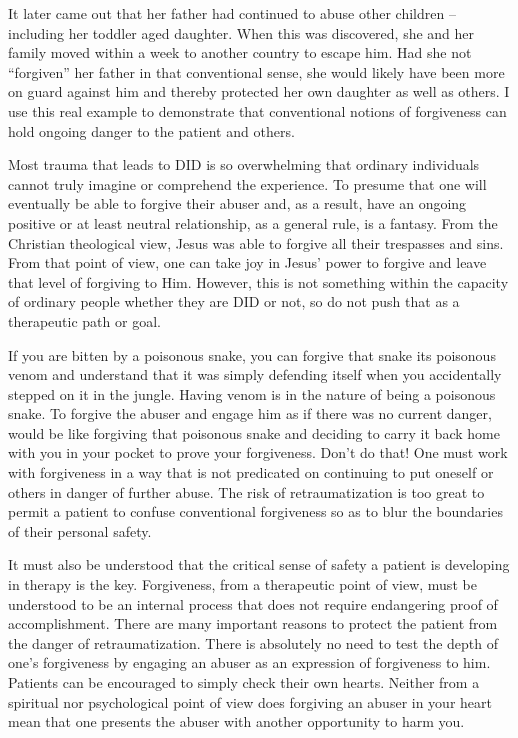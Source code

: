 \documentclass[]{book}
\begin{document}
It later came out that her father had continued to abuse other children -- including her toddler aged daughter. When this was discovered, she and her family moved within a week to another country to escape him. Had she not ``forgiven'' her father in that conventional sense, she would likely have been more on guard against him and thereby protected her own daughter as well as others. I use this real example to demonstrate that conventional notions of forgiveness can hold ongoing danger to the patient and others.

Most trauma that leads to DID is so overwhelming that ordinary individuals cannot truly imagine or comprehend the experience. To presume that one will eventually be able to forgive their abuser and, as a result, have an ongoing positive or at least neutral relationship, as a general rule, is a fantasy. From the Christian theological view, Jesus was able to forgive all their trespasses and sins. From that point of view, one can take joy in Jesus' power to forgive and leave that level of forgiving to Him. However, this is not something within the capacity of ordinary people whether they are DID or not, so do not push that as a therapeutic path or goal.

If you are bitten by a poisonous snake, you can forgive that snake its poisonous venom and understand that it was simply defending itself when you accidentally stepped on it in the jungle. Having venom is in the nature of being a poisonous snake. To forgive the abuser and engage him as if there was no current danger, would be like forgiving that poisonous snake and deciding to carry it back home with you in your pocket to prove your forgiveness. Don't do that!
One must work with forgiveness in a way that is not predicated on continuing to put oneself or others in danger of further abuse. The risk of retraumatization is too great to permit a patient to confuse conventional forgiveness so as to blur the boundaries of their personal safety.

It must also be understood that the critical sense of safety a patient is developing in therapy is the key. Forgiveness, from a therapeutic point of view, must be understood to be an internal process that does not require endangering proof of accomplishment. There are many important reasons to protect the patient from the danger of retraumatization. There is absolutely no need to test the depth of one's forgiveness by engaging an abuser as an expression of forgiveness to him. Patients can be encouraged to simply check their own hearts. Neither from a spiritual nor psychological point of view does forgiving an abuser in your heart mean that one presents the abuser with another opportunity to harm you.
\end{document}

